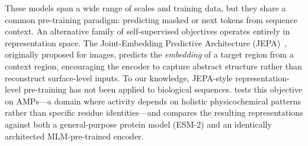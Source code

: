 These models span a wide range of scales and training data, but they share
a common pre-training paradigm: predicting masked or next tokens from
sequence context.
An alternative family of self-supervised objectives operates entirely in
representation space.
The Joint-Embedding Predictive Architecture (JEPA)~\citep{jepa_assran},
originally proposed for images, predicts the \emph{embedding} of a target
region from a context region, encouraging the encoder to capture abstract
structure rather than reconstruct surface-level inputs.
To our knowledge, JEPA-style representation-level pre-training has not been
applied to biological sequences.
\projectname{} tests this objective on AMPs---a domain where activity depends
on holistic physicochemical patterns rather than specific residue
identities---and compares the resulting representations against both a
general-purpose protein model (ESM-2) and an identically architected
MLM-pre-trained encoder.
